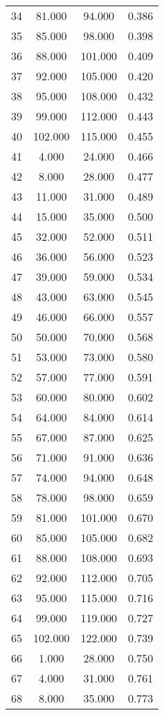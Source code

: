 \begin{tabular}{cccc}
  34 & 81.000 & 94.000 & 0.386 \\ 
  35 & 85.000 & 98.000 & 0.398 \\ 
  36 & 88.000 & 101.000 & 0.409 \\ 
  37 & 92.000 & 105.000 & 0.420 \\ 
  38 & 95.000 & 108.000 & 0.432 \\ 
  39 & 99.000 & 112.000 & 0.443 \\ 
  40 & 102.000 & 115.000 & 0.455 \\ 
  41 & 4.000 & 24.000 & 0.466 \\ 
  42 & 8.000 & 28.000 & 0.477 \\ 
  43 & 11.000 & 31.000 & 0.489 \\ 
  44 & 15.000 & 35.000 & 0.500 \\ 
  45 & 32.000 & 52.000 & 0.511 \\ 
  46 & 36.000 & 56.000 & 0.523 \\ 
  47 & 39.000 & 59.000 & 0.534 \\ 
  48 & 43.000 & 63.000 & 0.545 \\ 
  49 & 46.000 & 66.000 & 0.557 \\ 
  50 & 50.000 & 70.000 & 0.568 \\ 
  51 & 53.000 & 73.000 & 0.580 \\ 
  52 & 57.000 & 77.000 & 0.591 \\ 
  53 & 60.000 & 80.000 & 0.602 \\ 
  54 & 64.000 & 84.000 & 0.614 \\ 
  55 & 67.000 & 87.000 & 0.625 \\ 
  56 & 71.000 & 91.000 & 0.636 \\ 
  57 & 74.000 & 94.000 & 0.648 \\ 
  58 & 78.000 & 98.000 & 0.659 \\ 
  59 & 81.000 & 101.000 & 0.670 \\ 
  60 & 85.000 & 105.000 & 0.682 \\ 
  61 & 88.000 & 108.000 & 0.693 \\ 
  62 & 92.000 & 112.000 & 0.705 \\ 
  63 & 95.000 & 115.000 & 0.716 \\ 
  64 & 99.000 & 119.000 & 0.727 \\ 
  65 & 102.000 & 122.000 & 0.739 \\ 
  66 & 1.000 & 28.000 & 0.750 \\ 
  67 & 4.000 & 31.000 & 0.761 \\ 
  68 & 8.000 & 35.000 & 0.773 \\ 

\end{tabular}
